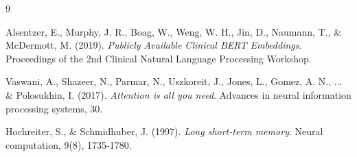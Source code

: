 \documentclass[11pt]{article}
\begin{document}
\begin{thebibliography}{9}

Alsentzer, E., Murphy, J. R., Boag, W., Weng, W. H., Jin, D., Naumann, T., \& McDermott, M. (2019).
\textit{Publicly Available Clinical BERT Embeddings}.
Proceedings of the 2nd Clinical Natural Language Processing Workshop.

Vaswani, A., Shazeer, N., Parmar, N., Uszkoreit, J., Jones, L., Gomez, A. N., ... \& Polosukhin, I. (2017).
\textit{Attention is all you need}.
Advances in neural information processing systems, 30.

Hochreiter, S., \& Schmidhuber, J. (1997).
\textit{Long short-term memory}.
Neural computation, 9(8), 1735-1780.

\end{thebibliography}
\end{document}
